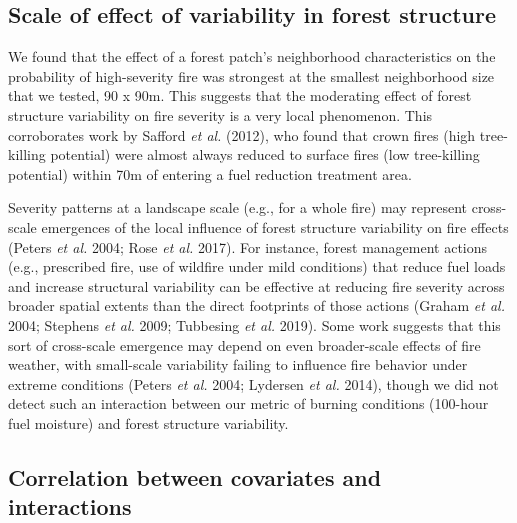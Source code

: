 \documentclass[]{article}
\begin{document}
\hypertarget{scale-of-effect-of-variability-in-forest-structure}{%
\subsection{Scale of effect of variability in forest
structure}\label{scale-of-effect-of-variability-in-forest-structure}}

We found that the effect of a forest patch's neighborhood
characteristics on the probability of high-severity fire was strongest
at the smallest neighborhood size that we tested, 90 x 90m. This
suggests that the moderating effect of forest structure variability on
fire severity is a very local phenomenon. This corroborates work by
Safford \emph{et al.} (2012), who found that crown fires (high
tree-killing potential) were almost always reduced to surface fires (low
tree-killing potential) within 70m of entering a fuel reduction
treatment area.

Severity patterns at a landscape scale (e.g., for a whole fire) may
represent cross-scale emergences of the local influence of forest
structure variability on fire effects (Peters \emph{et al.} 2004; Rose
\emph{et al.} 2017). For instance, forest management actions (e.g.,
prescribed fire, use of wildfire under mild conditions) that reduce fuel
loads and increase structural variability can be effective at reducing
fire severity across broader spatial extents than the direct footprints
of those actions (Graham \emph{et al.} 2004; Stephens \emph{et al.}
2009; Tubbesing \emph{et al.} 2019). Some work suggests that this sort
of cross-scale emergence may depend on even broader-scale effects of
fire weather, with small-scale variability failing to influence fire
behavior under extreme conditions (Peters \emph{et al.} 2004; Lydersen
\emph{et al.} 2014), though we did not detect such an interaction
between our metric of burning conditions (100-hour fuel moisture) and
forest structure variability.

\hypertarget{correlation-between-covariates-and-interactions}{%
\subsection{Correlation between covariates and
interactions}\label{correlation-between-covariates-and-interactions}}
\end{document}
